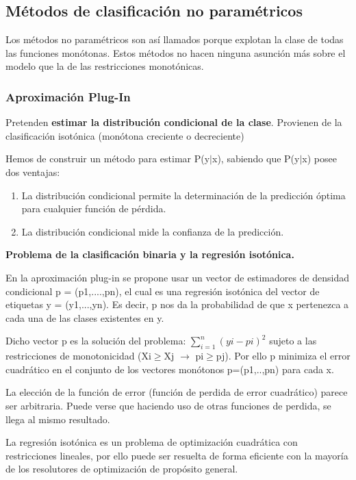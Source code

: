 \subsection{Métodos de clasificación no paramétricos}

Los métodos no paramétricos son así llamados porque explotan la clase de todas las
funciones monótonas. Estos métodos no hacen ninguna asunción más sobre el modelo que la de 
las restricciones monotónicas.

\subsubsection{Aproximación Plug-In}

Pretenden \textbf{estimar la distribución condicional de la clase}. Provienen de la
clasificación isotónica (monótona creciente o decreciente)

Hemos de construir un método para estimar P(y$|$x), sabiendo que P(y$|$x) posee
dos ventajas:
\begin{enumerate}
	\item La distribución condicional permite la determinación de la predicción 
	óptima para cualquier función de pérdida.
	\item La distribución condicional mide la confianza de la predicción.
\end{enumerate}


\textbf{Problema de la clasificación binaria y la regresión isotónica.}

En la aproximación plug-in se propone usar un vector de estimadores de densidad
condicional p = (p1,....,pn), el cual es una regresión isotónica del vector de
etiquetas y = (y1,...,yn). Es decir, p nos da la probabilidad de que x 
pertenezca a cada una de las clases existentes en y.

Dicho vector p es la solución del problema: $\sum_{i=1}^n{(yi-pi)^2}$  sujeto a las restricciones de
monotonicidad (Xi$\ge$Xj $\rightarrow$ pi$\ge$pj). Por ello p minimiza el error cuadrático en 
el conjunto de los vectores monótonos p=(p1,..,pn) para cada x.

La elección de la función de error (función de perdida de error cuadrático)
parece ser arbitraria. Puede verse que haciendo uso de otras funciones
de perdida, se llega al mismo resultado.

La regresión isotónica es un problema de optimización cuadrática con 
restricciones lineales, por ello puede ser resuelta de forma eficiente con
la mayoría de los resolutores de optimización de propósito general.

